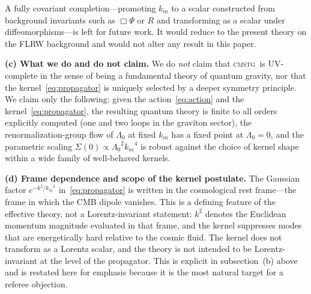 \documentclass[12pt,a4paper]{article}
\newcommand{\CMSTG}{\textsc{cmstg}}
\newcommand{\Lz}{{\Lambda_0}}
\newcommand{\km}{{k_m}}
\begin{document}
A fully covariant completion---promoting $\km$ to a scalar constructed from
background invariants such as $\Box\Psi$ or $R$ and transforming as a scalar
under diffeomorphisms---is left for future work. It would reduce to the present
theory on the FLRW background and would not alter any result in this paper.

\textbf{(c) What we do and do not claim.} We do \emph{not} claim that \CMSTG\
is UV-complete in the sense of being a fundamental theory of quantum gravity,
nor that the kernel~\eqref{eq:propagator} is uniquely selected by a deeper
symmetry principle. We claim only the following: given the
action~\eqref{eq:action} and the kernel~\eqref{eq:propagator}, the resulting
quantum theory is finite to all orders explicitly computed (one and two loops
in the graviton sector), the renormalization-group flow of $\Lz$ at fixed
$\km$ has a fixed point at $\Lz = 0$, and the parametric scaling
$\Sigma(0) \propto \Lz^2 \km^4$ is robust against the choice of kernel shape
within a wide family of well-behaved kernels.

\textbf{(d) Frame dependence and scope of the kernel postulate.}
The Gaussian factor $e^{-k^2/\km^2}$ in~\eqref{eq:propagator} is written in
the cosmological rest frame---the frame in which the CMB dipole vanishes.
This is a defining feature of the effective theory, not a Lorentz-invariant
statement: $k^2$ denotes the Euclidean momentum magnitude evaluated in that
frame, and the kernel suppresses modes that are energetically hard relative to
the cosmic fluid. The kernel does not transform as a Lorentz scalar, and the
theory is not intended to be Lorentz-invariant at the level of the propagator.
This is explicit in subsection~(b) above and is restated here for emphasis
because it is the most natural target for a referee objection.
\end{document}
